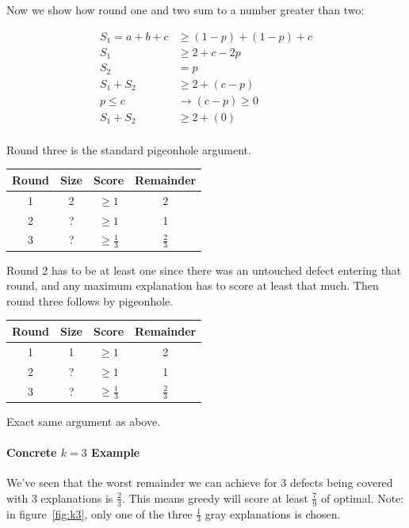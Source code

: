 \documentclass[11pt,twocolumn]{article}
\begin{document}
Now we show how round one and two sum to a number greater than two:

\begin{eqnarray*}
S_1 = a+b+c &\geq (1-p) + (1-p) + c \\
S_1 &\geq 2 + c - 2p \\
S_2 &= p \\
S_1 + S_2 &\geq 2 + (c - p) \\
p \leq c &\rightarrow (c-p) \geq 0 \\
S_1 + S_2 &\geq 2 + (0) \\
\end{eqnarray*}

Round three is the standard pigeonhole argument.

\begin{tabular}{cccc}\hline
Round & Size & Score & Remainder \\ \hline
1 & 2 & $\geq 1$ & 2 \\
2 & ? & $\geq 1$ & 1 \\
3 & ? & $\geq \frac13$ & $\frac23$ \\
\end{tabular}

Round 2 has to be at least one since there was an untouched defect entering that round, and any maximum explanation has to score at least that much.  Then round three follows by pigeonhole.

\begin{tabular}{cccc}\hline
Round & Size & Score & Remainder \\ \hline
1 & 1 & $\geq 1$ & 2 \\
2 & ? & $\geq 1$ & 1 \\
3 & ? & $\geq \frac13$ & $\frac23$ \\
\end{tabular}

Exact same argument as above.

\paragraph{Concrete $k=3$ Example}

We've seen that the worst remainder we can achieve for 3 defects being covered with 3 explanations is $\frac23$.  This means greedy will score at least $\frac79$ of optimal.  Note: in figure~\ref{fig:k3}, only one of the three $\frac13$ gray explanations is chosen.
\end{document}
